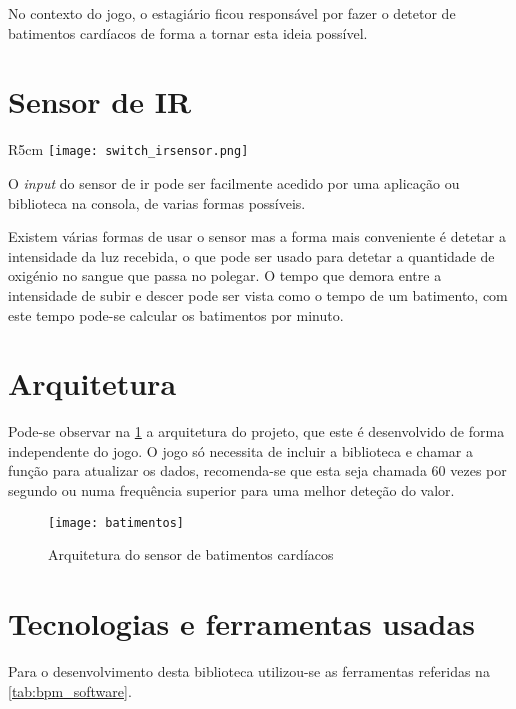 No contexto do jogo, o estagiário ficou responsável por fazer o detetor de batimentos cardíacos de forma a tornar esta ideia possível.

\newpage
\section{Sensor de IR}

\begin{wrapfigure}{R}{5cm}
  \centering
  \texttt{[image: switch\_irsensor.png]}
  \caption{\acrshort{ir} \textit{Sensor} da \gls{switch} \cite{switch_irsensor_source}}
  \label{fig:switch_irsensor}

\end{wrapfigure}


O \textit{input} do sensor de \acrshort{ir} pode ser facilmente acedido por uma aplicação ou biblioteca na consola, de varias formas possíveis.

Existem várias formas de usar o sensor mas a forma mais conveniente é detetar a intensidade da luz recebida, o que pode ser usado para detetar a quantidade de oxigénio no sangue que passa no polegar. O tempo que demora entre a intensidade de subir e descer pode ser vista como o tempo de um batimento, com este tempo pode-se calcular os batimentos por minuto.

\section{Arquitetura}

Pode-se observar na \cref{fig:bpm_arch} a arquitetura do projeto, que este é desenvolvido de forma independente do jogo. O jogo só necessita de incluir a biblioteca e chamar a função para atualizar os dados, recomenda-se que esta seja chamada 60 vezes por segundo ou numa frequência superior para uma melhor deteção do valor.

\begin{figure}[H]
  \texttt{[image: batimentos]}
  \caption{Arquitetura do sensor de batimentos cardíacos}
  \label{fig:bpm_arch}

\end{figure}

\newpage
\section{Tecnologias e ferramentas usadas}

Para o desenvolvimento desta biblioteca utilizou-se as ferramentas referidas na \cref{tab:bpm_software}.

